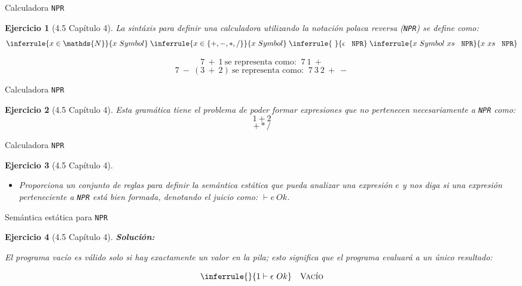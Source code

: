 \documentclass[11pt]{beamer}
\newtheorem{exercise}{Ejercicio}
\begin{document}
\begin{frame}{Calculadora  \texttt{NPR}}
	\begin{exercise}[4.5 Capítulo 4] 
		La sintáxis para definir una calculadora utilizando la notación polaca reversa (\texttt{NPR}) se define como:
		\[
			\inferrule{x \in \mathds{N}}{x \ Symbol} \; 
			\inferrule{x \in \{+,-,*,/ \}}{x \ Symbol} \; 
			\inferrule{\ }{\epsilon \ \texttt{ \texttt{NPR}}} \; 
			\inferrule{x \ Symbol \ xs\ \texttt{ \texttt{NPR}}}{x \ xs \ \texttt{ \texttt{NPR}}}
		\]
		
		$$7\ +\ 1\ \text{se representa como: }\ 7\ 1\ + $$
		$$7\ -\ (3\ +\ 2)\ \text{se representa como: }\ 7\ 3\ 2\ +\ -$$
		
	\end{exercise}
\end{frame}

\begin{frame}{Calculadora  \texttt{NPR}}
	\begin{exercise}[4.5 Capítulo 4] 
		Esta gramática tiene el problema de poder formar expresiones que no pertenecen necesariamente a \texttt{NPR} como:
		$$ 1 + 2$$
		$$ + * /$$
	\end{exercise}
\end{frame}


\begin{frame}{Calculadora  \texttt{NPR}}
	\begin{exercise}[4.5 Capítulo 4] 
		\begin{itemize}
			\item Proporciona un conjunto de reglas para definir la semántica estática que pueda analizar una expresión $e$ y nos diga si una expresión perteneciente a \texttt{NPR} está bien formada, denotando el juicio como: $\vdash e \ Ok$.
		\end{itemize}
	\end{exercise}
\end{frame}

\begin{frame}{Semántica estática para  \texttt{NPR}}
	\begin{exercise}[4.5 Capítulo 4] 		
		\textbf{Solución:} %
		
		\medskip
		
		El programa vacío es válido solo si hay exactamente un valor en la pila; esto significa que el programa evaluará a un único resultado:
		
		\[
		\inferrule{}{1 \vdash \epsilon \ Ok} \quad \textsc{Vacío}
		\]
	\end{exercise}
\end{frame}
\end{document}
